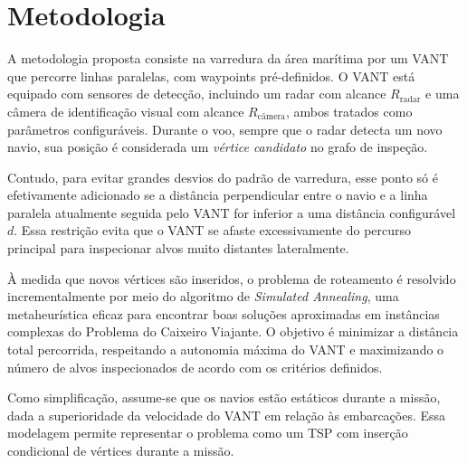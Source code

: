 \section{Metodologia}
A metodologia proposta consiste na varredura da área marítima por um VANT que percorre linhas paralelas, com waypoints pré-definidos. O VANT está equipado com sensores de detecção, incluindo um radar com alcance $R_{\text{radar}}$ e uma câmera de identificação visual com alcance $R_{\text{câmera}}$, ambos tratados como parâmetros configuráveis. Durante o voo, sempre que o radar detecta um novo navio, sua posição é considerada um \textit{vértice candidato} no grafo de inspeção.

Contudo, para evitar grandes desvios do padrão de varredura, esse ponto só é efetivamente adicionado se a distância perpendicular entre o navio e a linha paralela atualmente seguida pelo VANT for inferior a uma distância configurável $d$. Essa restrição evita que o VANT se afaste excessivamente do percurso principal para inspecionar alvos muito distantes lateralmente.

À medida que novos vértices são inseridos, o problema de roteamento é resolvido incrementalmente por meio do algoritmo de \textit{Simulated Annealing}, uma metaheurística eficaz para encontrar boas soluções aproximadas em instâncias complexas do Problema do Caixeiro Viajante. O objetivo é minimizar a distância total percorrida, respeitando a autonomia máxima do VANT e maximizando o número de alvos inspecionados de acordo com os critérios definidos.

Como simplificação, assume-se que os navios estão estáticos durante a missão, dada a superioridade da velocidade do VANT em relação às embarcações. Essa modelagem permite representar o problema como um TSP com inserção condicional de vértices durante a missão.